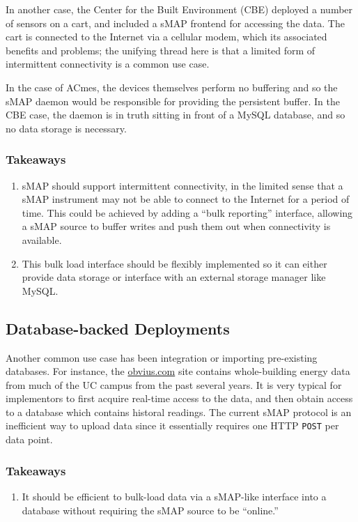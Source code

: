 \documentclass[10pt,letterpaper]{article}
\newcommand{\smap}{sMAP}
\begin{document}
In another case, the Center for the Built Environment (CBE) deployed a number
of sensors on a cart, and included a \smap{} frontend for accessing the data.
The cart is connected to the Internet via a cellular modem, which its
associated benefits and problems; the unifying thread here is that a limited
form of intermittent connectivity is a common use case.

In the case of ACmes, the devices themselves perform no buffering and so the
\smap{} daemon would be responsible for providing the persistent buffer.  In
the CBE case, the daemon is in truth sitting in front of a MySQL database, and
so no data storage is necessary.

\subsubsection{Takeaways}
\begin{enumerate}
\item \smap{} should support intermittent connectivity, in the limited sense
  that a \smap{} instrument may not be able to connect to the Internet for a
  period of time.  This could be achieved by adding a ``bulk reporting''
  interface, allowing a \smap{} source to buffer writes and push them out when
  connectivity is available.
\item This bulk load interface should be flexibly implemented so it can either
  provide data storage or interface with an external storage manager like MySQL.
\end{enumerate}

\subsection{Database-backed Deployments}

Another common use case has been integration or importing pre-existing
databases.  For instance, the \url{obvius.com} site contains
whole-building energy data from much of the UC campus from the past several
years.  It is very typical for implementors to first acquire real-time access
to the data, and then obtain access to a database which contains historal
readings.  The current \smap{} protocol is an inefficient way to upload data
since it essentially requires one HTTP {\tt POST} per data point.

\subsubsection{Takeaways}
\begin{enumerate}
\item It should be efficient to bulk-load data via a \smap-like interface
  into a database without requiring the \smap{} source to be ``online.''
\end{enumerate}
\end{document}
